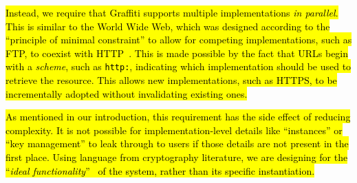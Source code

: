\hl{%
Instead, we require that Graffiti supports multiple implementations
\emph{in parallel}.
This is similar to the World Wide Web, which was designed according to the
``principle of minimal constraint'' to allow for competing implementations,
such as FTP, to coexist with HTTP~{\cite{weavingtheweb}}.
This is made possible by the fact that URLs begin with a \emph{scheme},
such as \texttt{http:}, indicating which implementation should be
used to retrieve the resource.
This allows new implementations, such as HTTPS, to be
incrementally adopted without invalidating existing ones.
}%

\hl{%
As mentioned in our introduction,
this requirement has the side effect of reducing complexity.
It is not possible for implementation-level details like
``instances'' or ``key management'' to leak through to users
if those details are not present in the first place.
Using language from cryptography literature,
we are designing for the ``\emph{ideal functionality}''~{\cite{universallycomposable}}
of the system, rather than its specific instantiation.
}%
